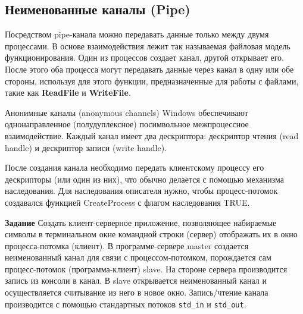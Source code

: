 \documentclass[a4paper]{article}
\begin{document}
\subsection{Неименованные каналы (Pipe)}
	Посредством pipe-канала можно передавать данные только между двумя процессами. В основе взаимодействия лежит так называемая файловая модель функционирования. Один из процессов создает канал, другой открывает его. После этого оба процесса могут передавать данные через канал в одну или обе стороны, используя для этого функции, предназначенные для работы с файлами, такие как \textbf{ReadFile} и \textbf{WriteFile}.
	
	Анонимные каналы (anonymous channels) Windows обеспечивают однонаправленное (полудуплексное) посимвольное межпроцессное взаимодействие. Каждый канал имеет два дескриптора: дескриптор чтения (read handle) и дескриптор записи (write handle).
	
	После создания канала необходимо передать клиентскому процессу его дескрипторы (или один из них), что обычно делается с помощью механизма наследования. Для наследования описателя нужно, чтобы процесс-потомок создавался функцией CreateProcess с флагом наследования TRUE.
	
	\textbf{Задание} Создать клиент-серверное приложение, позволяющее набираемые символы в терминальном окне командной строки (сервер) отображать их в окно процесса-потомка (клиент).
В программе-сервере master создается неименованный канал для связи с процессом-потомком, порождается сам процесс-потомок (программа-клиент) slave. На стороне сервера производится запись из консоли в канал. В slave открывается неименованный канал и осуществляется считывание из него в новое окно. Запись/чтение канала производится с помощью стандартных потоков \texttt{std\_in} и \texttt{std\_out}.
\end{document}
